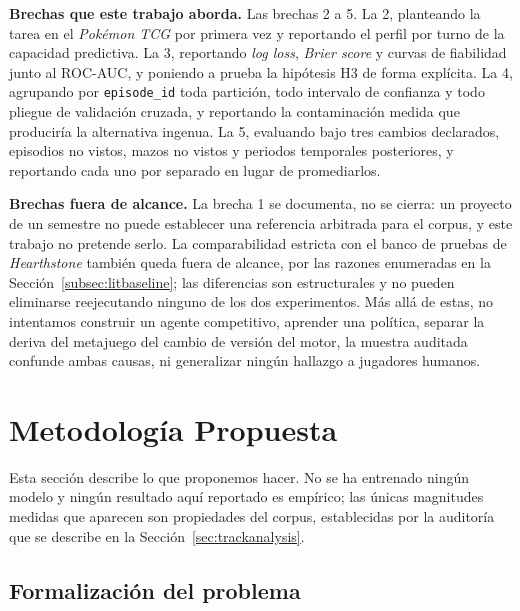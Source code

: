 \documentclass[conference]{IEEEtran}
\newcommand{\code}[1]{\texttt{#1}}
\begin{document}
\noindent\textbf{Brechas que este trabajo aborda.} Las brechas 2 a 5. La 2,
planteando la tarea en el \emph{Pok\'emon TCG} por primera vez y reportando
el perfil por turno de la capacidad predictiva. La 3, reportando
\emph{log loss}, \emph{Brier score} y curvas de fiabilidad junto al ROC-AUC,
y poniendo a prueba la hip\'otesis H3 de forma expl\'icita. La 4, agrupando
por \code{episode\_id} toda partici\'on, todo intervalo de confianza y todo
pliegue de validaci\'on cruzada, y reportando la contaminaci\'on medida que
producir\'ia la alternativa ingenua. La 5, evaluando bajo tres cambios
declarados, episodios no vistos, mazos no vistos y periodos temporales
posteriores, y reportando cada uno por separado en lugar de promediarlos.

\noindent\textbf{Brechas fuera de alcance.} La brecha 1 se documenta, no se
cierra: un proyecto de un semestre no puede establecer una referencia
arbitrada para el corpus, y este trabajo no pretende serlo. La
comparabilidad estricta con el banco de pruebas de \emph{Hearthstone}
tambi\'en queda fuera de alcance, por las razones enumeradas en la
Secci\'on~\ref{subsec:litbaseline}; las diferencias son estructurales y no
pueden eliminarse reejecutando ninguno de los dos experimentos. M\'as
all\'a de estas, no intentamos construir un agente competitivo, aprender una
pol\'itica, separar la deriva del metajuego del cambio de versi\'on del
motor, la muestra auditada confunde ambas causas, ni generalizar
ning\'un hallazgo a jugadores humanos.

\section{Metodolog\'ia Propuesta}
\label{sec:methodology}

Esta secci\'on describe lo que proponemos hacer. No se ha entrenado
ning\'un modelo y ning\'un resultado aqu\'i reportado es emp\'irico; las
\'unicas magnitudes medidas que aparecen son propiedades del corpus,
establecidas por la auditor\'ia que se describe en la
Secci\'on~\ref{sec:trackanalysis}.

\subsection{Formalizaci\'on del problema}
\label{subsec:formalization}
\end{document}
